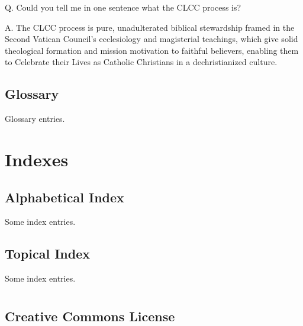 \documentclass[oneside]{book}
\begin{document}
Q. Could you tell me in one sentence what the CLCC process is?

A. The CLCC process is pure, unadulterated biblical stewardship framed in the
Second Vatican Council's ecclesiology and magisterial teachings, which give
solid theological formation and mission motivation to faithful believers,
enabling them to Celebrate their Lives as Catholic Christians in a
dechristianized culture.


\chapter{Glossary}

Glossary entries.


\backmatter
\part{Indexes}


\chapter{Alphabetical Index}

Some index entries.


\chapter{Topical Index}

Some index entries.


\part{}


\chapter{Creative Commons License}
\end{document}
